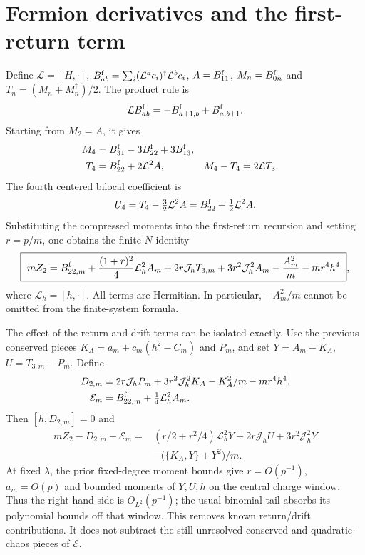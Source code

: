 \documentclass[11pt,a4paper]{article}
\newcommand{\Jh}{\mathcal J_h}
\newcommand{\Lh}{\mathcal L_h}
\begin{document}
\section{Fermion derivatives and the first-return term}
Define $\mathcal L=[H,\cdot]$,
$B_{ab}^{\rm f}=\sum_i(\mathcal L^ac_i)^\dagger\mathcal L^bc_i$,
$A=B_{11}^{\rm f}$, $M_n=B_{0n}^{\rm f}$ and
$T_n=(M_n+M_n^\dagger)/2$. The product rule is
\begin{equation}
 \mathcal L B_{ab}^{\rm f}=-B_{a+1,b}^{\rm f}+B_{a,b+1}^{\rm f}.
\end{equation}
Starting from $M_2=A$, it gives
\begin{align}
 M_4&=B_{31}^{\rm f}-3B_{22}^{\rm f}+3B_{13}^{\rm f},\\
 T_4&=B_{22}^{\rm f}+2\mathcal L^2A,&
 M_4-T_4&=2\mathcal L T_3.
\end{align}
The fourth centered bilocal coefficient is
\begin{equation}
 U_4=T_4-\tfrac32\mathcal L^2A
     =B_{22}^{\rm f}+\tfrac12\mathcal L^2A.
\end{equation}
Substituting the compressed moments into the first-return recursion
and setting $r=p/m$, one obtains the finite-$N$ identity
\begin{equation}\label{eq:Z2}
 \boxed{\ mZ_2=B_{22,m}^{\rm f}+\frac{(1+r)^2}{4}\Lh^2A_m
   +2r\Jh T_{3,m}+3r^2\Jh^2A_m
   -\frac{A_m^2}{m}-mr^4h^4\ },
\end{equation}
where $\Lh=[h,\cdot]$. All terms are Hermitian. In particular,
$-A_m^2/m$ cannot be omitted from the finite-system formula.

The effect of the return and drift terms can be isolated exactly.
Use the previous conserved pieces
$K_A=a_m+c_m(h^2-C_m)$ and $P_m$, and set
$Y=A_m-K_A$, $U=T_{3,m}-P_m$. Define
\begin{align}
 D_{2,m}&=2r\Jh P_m+3r^2\Jh^2K_A-K_A^2/m-mr^4h^4,\\
 \mathcal E_m&=B_{22,m}^{\rm f}+\tfrac14\Lh^2A_m.
\end{align}
Then $[h,D_{2,m}]=0$ and
\begin{align}\label{eq:remainder}
 mZ_2-D_{2,m}-\mathcal E_m={}&
 (r/2+r^2/4)\Lh^2Y+2r\Jh U+3r^2\Jh^2Y\nonumber\\
 &-\bigl(\{K_A,Y\}+Y^2\bigr)/m .
\end{align}
At fixed $\lambda$, the prior fixed-degree moment bounds give
$r=O(p^{-1})$, $a_m=O(p)$ and bounded moments of $Y,U,h$ on the
central charge window. Thus the right-hand side is $O_{L^2}(p^{-1})$;
the usual binomial tail absorbs its polynomial bounds off that window.
This removes known return/drift contributions. It does not subtract
the still unresolved conserved and quadratic-chaos pieces of
$\mathcal E$.
\end{document}

